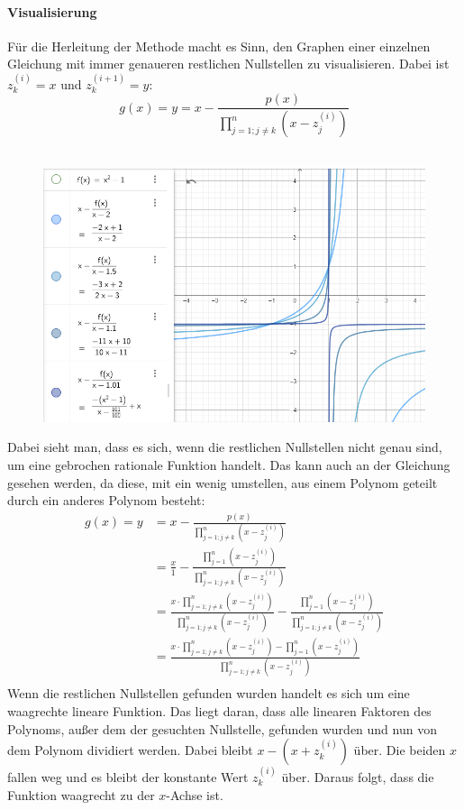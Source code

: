 \documentclass[12pt]{article}
\begin{document}
\paragraph{Visualisierung}
Für die Herleitung der Methode macht es Sinn, den Graphen einer einzelnen Gleichung mit immer genaueren restlichen Nullstellen zu visualisieren. Dabei ist $z_k^{(i)} = x$ und $z_k^{(i+1)} = y$:
\begin{equation}
    g(x) = y = x - \frac{p(x)}{\prod_{j=1;j\neq k}^{n} (x-z_j^{(i)})}
\end{equation}\\
\begin{figure}[H]
    \centering
    \includegraphics[scale=.6]{./BeispielHerleitung.png}
\end{figure}
Dabei sieht man, dass es sich, wenn die restlichen Nullstellen nicht genau sind, um eine gebrochen rationale Funktion handelt. Das kann auch an der Gleichung gesehen werden, da diese, mit ein wenig umstellen, aus einem Polynom geteilt durch ein anderes Polynom besteht:
\begin{align*}
    g(x) = y &= x - \frac{p(x)}{\prod_{j=1;j\neq k}^{n} (x-z_j^{(i)})} \\
    &= \frac{x}{1} - \frac{\prod_{j=1}^{n} (x-z_j^{(i)})}{\prod_{j=1;j\neq k}^{n} (x-z_j^{(i)})} \\
    &= \frac{x \cdot \prod_{j=1;j\neq k}^{n} (x-z_j^{(i)})}{\prod_{j=1;j\neq k}^{n} (x-z_j^{(i)})} - \frac{\prod_{j=1}^{n} (x-z_j^{(i)})}{\prod_{j=1;j\neq k}^{n} (x-z_j^{(i)})} \\
    &= \frac{x \cdot \prod_{j=1;j\neq k}^{n} (x-z_j^{(i)}) - \prod_{j=1}^{n} (x-z_j^{(i)})}{\prod_{j=1;j\neq k}^{n} (x-z_j^{(i)})} \\
\end{align*}
Wenn die restlichen Nullstellen gefunden wurden handelt es sich um eine waagrechte lineare Funktion. Das liegt daran, dass alle linearen Faktoren des Polynoms, außer dem der gesuchten Nullstelle, gefunden wurden und nun von dem Polynom dividiert werden. Dabei bleibt $x-(x+z_k^{(i)})$ über. Die beiden $x$ fallen weg und es bleibt der konstante Wert $z_k^{(i)}$ über. Daraus folgt, dass die Funktion waagrecht zu der $x$-Achse ist.
\end{document}
